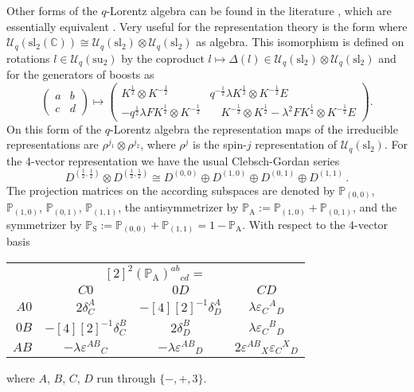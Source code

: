 \documentclass[12pt,a4paper]{article}
\newcommand{\R}{\mathcal{R}}
\newcommand{\RI}{ \mathcal{R}_{\mathrm{I}} }
\newcommand{\RII}{ \mathcal{R}_{\mathrm{II}} }
\newcommand{\Proj}{\mathbb{P}}
\newcommand{\Hcal}{\mathcal{H}}
\newcommand{\slq}{{\mathcal{U}_q(\mathrm{sl}_2)}}
\newcommand{\suq}{{\mathcal{U}_q(\mathrm{su}_2)}}
\newcommand{\slC}{{\mathcal{U}_q(\mathrm{sl}_2(\mathbb{C})) }}
\begin{document}
Other forms of the $q$-Lorentz algebra can be found in the literature
\cite{Ogievetskii:1991a,Majid:1993,Lorek:1997a}, which are essentially
equivalent \cite{Rohregger:1999,Blohmann}. Very useful for the
representation theory is the form where $\slC \cong \slq \otimes \slq$
as algebra. This isomorphism is defined on rotations $l\in\suq$ by the
coproduct $l \mapsto \Delta(l) \in \slq \otimes \slq$ and for the
generators of boosts as
\begin{equation}
\label{eq:boostdef}
  \begin{pmatrix} a & b \\ c & d \end{pmatrix}  \mapsto
  \begin{pmatrix}
    K^{\frac{1}{2}}\otimes K^{-\frac{1}{2}} &
    q^{-\frac{1}{2}}\lambda K^{\frac{1}{2}}
    \otimes K^{-\frac{1}{2}} E \\
    -q^{\frac{1}{2}}\lambda F K^{\frac{1}{2}}
    \otimes K^{-\frac{1}{2}} & \quad
    K^{-\frac{1}{2}}\otimes K^{\frac{1}{2}}
    - \lambda^2 F K^{\frac{1}{2}}\otimes K^{-\frac{1}{2}} E
  \end{pmatrix}.
\end{equation}
On this form of the $q$-Lorentz algebra the representation maps of the
irreducible representations are $\rho^{j_1}\otimes\rho^{j_2}$, where
$\rho^j$ is the spin-$j$ representation of $\slq$. For the 4-vector
representation we have the usual Clebsch-Gordan series
\begin{equation}
\label{eq:CGseries}
  D^{(\frac{1}{2},\frac{1}{2})} \otimes D^{(\frac{1}{2},\frac{1}{2})}
  \cong D^{(0,0)} \oplus D^{(1,0)} \oplus D^{(0,1)} \oplus D^{(1,1)} \,.
\end{equation}
The projection matrices on the according subspaces are denoted by
$\Proj_{(0,0)}$, $\Proj_{(1,0)}$, $\Proj_{(0,1)}$, $\Proj_{(1,1)}$,
the antisymmetrizer by $\Proj_{\mathrm{A}} := \Proj_{(1,0)} +
\Proj_{(0,1)}$, and the symmetrizer by $\Proj_{\mathrm{S}} :=
\Proj_{(0,0)} + \Proj_{(1,1)} = 1 - \Proj_{\mathrm{A}}$. 
With respect to the 4-vector basis
\begin{center}
\renewcommand{\arraystretch}{1.5}
\begin{tabular}{r|ccc}
\multicolumn{4}{c}{ $[2]^2 (\Proj_{\mathrm{A}})^{ab}{}_{cd}=$ }\\ 
& $C0$ & $0D$  & $CD$ \\ \hline
$A0$ & $2\delta^A_C$ & $-[4][2]^{-1}\delta^A_D$ &
$\lambda \varepsilon_C{}^A{}_D$ \\
$0B$ & $-[4][2]^{-1}\delta^B_C$ & $2\delta^B_D$ &
$\lambda \varepsilon_C{}^B{}_D$ \\
$AB$ & $-\lambda\varepsilon^{AB}{}_C$ &
$-\lambda \varepsilon^{AB}{}_D$ &
$2\varepsilon^{AB}{}_X\varepsilon_C{}^X{}_D$
\end{tabular}
\end{center}
where $A$, $B$, $C$, $D$ run through $\{-,+,3\}$.
\end{document}
